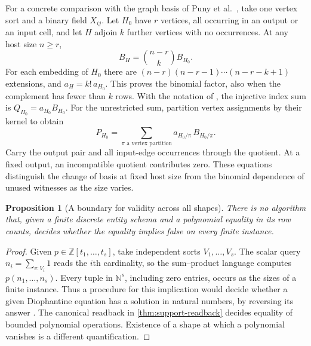 \documentclass[11pt,a4paper]{article}
\newtheorem{proposition}[proposition]{Proposition}
\theoremstyle{definition}
\theoremstyle{remark}\newaliascnt{remark}{theorem}
\newcommand{\N}{\mathbb N}
\numberwithin{equation}{section}
\begin{document}
For a concrete comparison with the graph basis of Puny et al.\ \cite[Theorem 2.1 and Equation (7)]{graph-poly-basis}, take one vertex sort and a binary field $X_{ij}$. Let $H_0$ have $r$ vertices, all occurring in an output or an input cell, and let $H$ adjoin $k$ further vertices with no occurrences. At any host size $n\ge r$,
\[
                    B_H=\binom{n-r}{k}B_{H_0}.
\]
For each embedding of \(H_0\) there are \((n-r)(n-r-1)\cdots(n-r-k+1)\) extensions, and \(a_H=k!\,a_{H_0}\). This proves the binomial factor, also when the complement has fewer than \(k\) rows. With the notation of \cite[Equations (4) and (7)]{graph-poly-basis}, the injective index sum is \(Q_{H_0}=a_{H_0}B_{H_0}\). For the unrestricted sum, partition vertex assignments by their kernel to obtain
\[
             P_{H_0}=\sum_{\pi\text{ a vertex partition}}
                       a_{H_0/\pi}\, B_{H_0/\pi}.
\]
Carry the output pair and all input-edge occurrences through the quotient. At a fixed output, an incompatible quotient contributes zero. These equations distinguish the change of basis at fixed host size from the binomial dependence of unused witnesses as the size varies.

\begin{proposition}[A boundary for validity across all shapes]\label{prop:shape-concept-limit}
There is no algorithm that, given a finite discrete entity schema and a polynomial equality in its row counts, decides whether the equality implies false on every finite instance.
\end{proposition}
\begin{proof}
Given $p\in\mathbb Z[t_1,\ldots,t_s]$, take independent sorts $V_1,\ldots,V_s$. The scalar query $n_i=\sum_{v:V_i}1$ reads the $i$th cardinality, so the sum--product language computes $p(n_1,\ldots,n_s)$. Every tuple in $\N^s$, including zero entries, occurs as the sizes of a finite instance. Thus a procedure for this implication would decide whether a given Diophantine equation has a solution in natural numbers, by reversing its answer \cite{diophantine-undecidability}. The canonical readback in \cref{thm:support-readback} decides equality of bounded polynomial operations. Existence of a shape at which a polynomial vanishes is a different quantification.
\end{proof}
\end{document}
